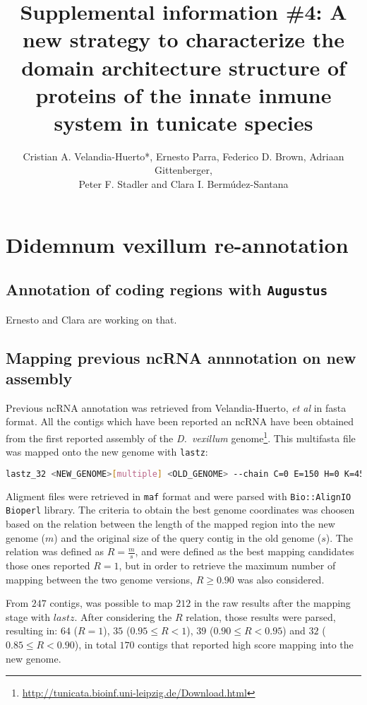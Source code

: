 \documentclass[11pt]{article}
\title{Supplemental information \#4: A new strategy to characterize the domain 
architecture structure of proteins of the innate inmune system in tunicate 
species}
\author{Cristian A. Velandia-Huerto*, Ernesto Parra, Federico D. 
Brown, Adriaan Gittenberger, \\ Peter F. Stadler and Clara I. 
Berm\'{u}dez-Santana}
\newcommand{\TODO}[1]{\begingroup\color{red}#1\endgroup}
\begin{document}
\maketitle

\section*{Didemnum vexillum re-annotation}
\subsection*{Annotation of coding regions with \texttt{Augustus}}
\TODO{Ernesto and Clara are working on that}.
\subsection*{Mapping previous ncRNA annnotation on new assembly}
Previous ncRNA annotation was retrieved from Velandia-Huerto, \textit{et al} \cite{} 
in fasta format. All the contigs which have been reported an ncRNA have been obtained
from the first reported assembly of the \textit{D.\ vexillum} 
genome\footnote{\url{http://tunicata.bioinf.uni-leipzig.de/Download.html}}. This
multifasta file was mapped onto the new genome with \texttt{lastz}:

\begin{lstlisting}[language=bash, breaklines=true]
lastz_32 <NEW_GENOME>[multiple] <OLD_GENOME> --chain C=0 E=150 H=0 K=4500 L=3000 M=254 O=600 Q=human_chimp.v2.q T=2 Y=15000 --format=maf+
\end{lstlisting}

Aligment files were retrieved in \texttt{maf} format and were parsed
with \texttt{Bio::AlignIO} \texttt{Bioperl} library. The criteria to
obtain the best genome coordinates was choosen based on the relation
between the length of the mapped region into the new genome ($m$) and
the original size of the query contig in the old genome ($s$). The
relation was defined as $R = \frac{m}{s}$, and were defined as the best 
mapping candidates those ones reported $R = 1$, but in order to retrieve
the maximum number of mapping between the two genome versions, $R \geq 0.90$
was also considered.

From $247$ contigs, was possible to map $212$ in the raw results after the 
mapping stage with $lastz$. After considering the $R$ relation, those results
were parsed, resulting in: $64$ ($R = 1$), $35$ ($0.95 \leq R < 1 $), 
$39$ ($0.90 \leq R < 0.95$) and $32$ ($0.85 \leq R < 0.90$), in total
$170$ contigs that reported high score mapping into the new genome.
\end{document}
